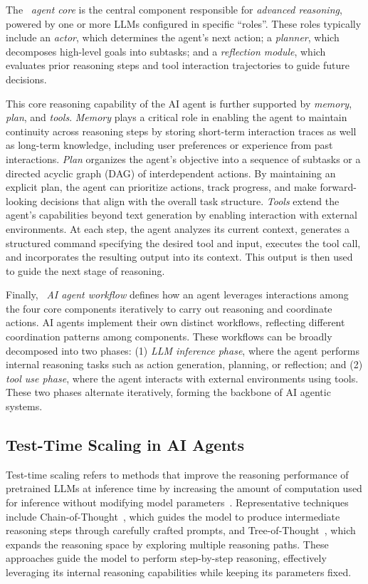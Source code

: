The ~\emph{agent core} is the central component responsible for \emph{advanced reasoning}, powered by one or more LLMs configured in specific ``roles''. These roles typically include an \emph{actor}, which determines the agent’s next action; a \emph{planner}, which decomposes high-level goals into subtasks; and a \emph{reflection module}, which evaluates prior reasoning steps and tool interaction trajectories to guide future decisions.

This core reasoning capability of the AI agent is further supported by \emph{memory}, \emph{plan}, and \emph{tools}.  \emph{Memory} plays a critical role in enabling the agent to maintain continuity across reasoning steps by storing short-term interaction traces as well as long-term knowledge, including user preferences or experience from past interactions. 
 \emph{Plan} organizes the agent’s objective into a sequence of subtasks or a directed acyclic graph (DAG) of interdependent actions. By maintaining an explicit plan, the agent can prioritize actions, track progress, and make forward-looking decisions that align with the overall task structure.
 \emph{Tools} extend the agent’s capabilities beyond text generation by enabling interaction with external environments. At each step, the agent analyzes its current context, generates a structured command specifying the desired tool and input, executes the tool call, and incorporates the resulting output into its context. This output is then used to guide the next stage of reasoning.

Finally, ~\emph{AI agent workflow} defines how an agent leverages interactions among the four core components iteratively to carry out reasoning and coordinate actions. AI agents implement their own distinct workflows, reflecting different coordination patterns among components. These workflows can be broadly decomposed into two phases: (1) \emph{LLM inference phase}, where the agent performs internal reasoning tasks such as action generation, planning, or reflection; and (2) \emph{tool use phase}, where the agent interacts with external environments using tools. These two phases alternate iteratively, forming the backbone of AI agentic systems.

\subsection{Test-Time Scaling in AI Agents}

Test-time scaling refers to methods that improve the reasoning performance of pretrained LLMs at inference time by increasing the amount of computation used for inference without modifying model parameters~\cite{cot,tot,self_cot,least_cot,snell2024scalingllmtesttimecompute}. Representative techniques include Chain-of-Thought~\cite{cot}, which guides the model to produce intermediate reasoning steps through carefully crafted prompts, and Tree-of-Thought~\cite{tot}, which expands the reasoning space by exploring multiple reasoning paths. These approaches guide the model to perform step-by-step reasoning, effectively leveraging its internal reasoning capabilities while keeping its parameters fixed.

